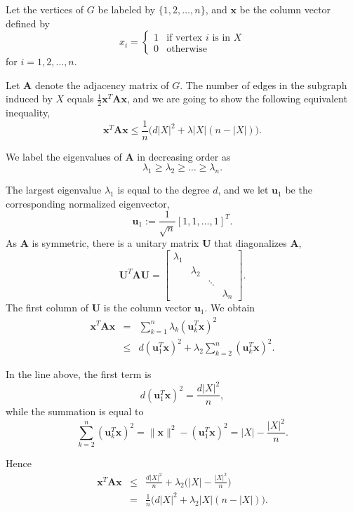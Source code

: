\documentclass[12pt]{article}
\begin{document}
Let the vertices of $G$ be labeled by $\{1,2,\ldots, n\}$, and $\mathbf{x}$ be the column vector defined by
\[
x_i = \begin{cases}
1 & \text{if vertex $i$ is in $X$} \\
0 & \text{otherwise}
\end{cases}
\]
for $i=1,2,\ldots, n$.


Let $\mathbf{A}$ denote the adjacency matrix of $G$. The number of edges in the subgraph induced by $X$ equals $\frac{1}{2} \mathbf{x}^T \mathbf{A x}$, and we are going to show the following equivalent inequality,
\[\mathbf{x}^T \mathbf{A x} \leq \frac{1}{n} \Big( d|X|^2 +  \lambda |X|(n- |X|) \Big).
\]

We label the eigenvalues of $\mathbf{A}$ in decreasing order as
\[
 \lambda_1 \geq \lambda_2 \geq \ldots \geq \lambda_n.
\]


The largest eigenvalue $\lambda_1$ is equal to the degree $d$, and we let $\mathbf{u}_1$ be the corresponding normalized eigenvector,
\[
  \mathbf{u}_1 := \frac{1}{\sqrt{n}} [1, 1, \ldots, 1 ]^T.
\]
As $\mathbf{A}$ is symmetric, there is a unitary matrix $\mathbf{U}$ that diagonalizes $\mathbf{A}$,
\[
 \mathbf{U}^T \mathbf{A U} = 
 \begin{bmatrix}
 \lambda_1 & & &\\
 & \lambda_2 &&\\
 & & \ddots & \\
&&&     \lambda_n
 \end{bmatrix}.
\]
The first column of $\mathbf{U}$ is the column vector $\mathbf{u}_1$. We obtain
\begin{eqnarray*}
 \mathbf{x}^T \mathbf{A x} &=& \sum_{k=1}^n \lambda_k (\mathbf{u}_k^T \mathbf{x})^2 \\
 &\leq & d (\mathbf{u}_1^T \mathbf{x})^2 + \lambda_2 \sum_{k=2}^n  (\mathbf{u}_k^T \mathbf{x})^2.
\end{eqnarray*}

In the line above, the first term is 
\[
 d (\mathbf{u}_1^T \mathbf{x})^2 = \frac{d |X|^2}{n},
\]
while the summation is equal to
\[
\sum_{k=2}^n  (\mathbf{u}_k^T  \mathbf{x})^2 = \|\mathbf{x}\|^2 - (\mathbf{u}_1^T \mathbf{x})^2 = |X| - \frac{|X|^2}{n}.
\]

Hence
\begin{eqnarray*}
\mathbf{x}^T \mathbf{A x} & \leq & \frac{d |X|^2}{n} + \lambda_2 \Big( |X| - \frac{|X|^2}{n} \Big)\\
& = & \frac{1}{n} \Big( d|X|^2 +  \lambda_2 |X|(n- |X|) \Big).
\end{eqnarray*}
\end{document}
